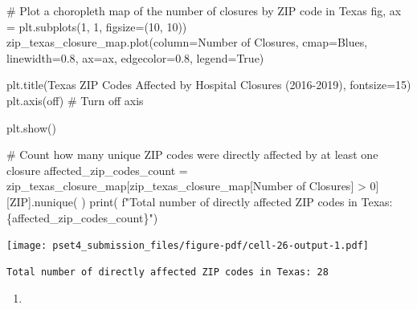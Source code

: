 \documentclass[
  letterpaper,
  DIV=11,
  numbers=noendperiod]{scrartcl}
\newenvironment{Shaded}{\begin{snugshade}}{\end{snugshade}}
\newcommand{\BuiltInTok}[1]{\textcolor[rgb]{0.00,0.23,0.31}{#1}}
\newcommand{\CommentTok}[1]{\textcolor[rgb]{0.37,0.37,0.37}{#1}}
\newcommand{\DecValTok}[1]{\textcolor[rgb]{0.68,0.00,0.00}{#1}}
\newcommand{\FloatTok}[1]{\textcolor[rgb]{0.68,0.00,0.00}{#1}}
\newcommand{\NormalTok}[1]{\textcolor[rgb]{0.00,0.23,0.31}{#1}}
\newcommand{\OperatorTok}[1]{\textcolor[rgb]{0.37,0.37,0.37}{#1}}
\newcommand{\SpecialCharTok}[1]{\textcolor[rgb]{0.37,0.37,0.37}{#1}}
\newcommand{\SpecialStringTok}[1]{\textcolor[rgb]{0.13,0.47,0.30}{#1}}
\newcommand{\StringTok}[1]{\textcolor[rgb]{0.13,0.47,0.30}{#1}}
\newcommand{\VariableTok}[1]{\textcolor[rgb]{0.07,0.07,0.07}{#1}}
\providecommand{\tightlist}{%
  \setlength{\itemsep}{0pt}\setlength{\parskip}{0pt}}\usepackage{longtable,booktabs,array}
\begin{document}
\begin{Shaded}
\begin{Highlighting}[]
\CommentTok{\# Plot a choropleth map of the number of closures by ZIP code in Texas}
\NormalTok{fig, ax }\OperatorTok{=}\NormalTok{ plt.subplots(}\DecValTok{1}\NormalTok{, }\DecValTok{1}\NormalTok{, figsize}\OperatorTok{=}\NormalTok{(}\DecValTok{10}\NormalTok{, }\DecValTok{10}\NormalTok{))}
\NormalTok{zip\_texas\_closure\_map.plot(column}\OperatorTok{=}\StringTok{\textquotesingle{}Number of Closures\textquotesingle{}}\NormalTok{, cmap}\OperatorTok{=}\StringTok{\textquotesingle{}Blues\textquotesingle{}}\NormalTok{,}
\NormalTok{                           linewidth}\OperatorTok{=}\FloatTok{0.8}\NormalTok{, ax}\OperatorTok{=}\NormalTok{ax, edgecolor}\OperatorTok{=}\StringTok{\textquotesingle{}0.8\textquotesingle{}}\NormalTok{, legend}\OperatorTok{=}\VariableTok{True}\NormalTok{)}

\NormalTok{plt.title(}\StringTok{\textquotesingle{}Texas ZIP Codes Affected by Hospital Closures (2016{-}2019)\textquotesingle{}}\NormalTok{, fontsize}\OperatorTok{=}\DecValTok{15}\NormalTok{)}
\NormalTok{plt.axis(}\StringTok{\textquotesingle{}off\textquotesingle{}}\NormalTok{)  }\CommentTok{\# Turn off axis}

\NormalTok{plt.show()}

\CommentTok{\# Count how many unique ZIP codes were directly affected by at least one closure}
\NormalTok{affected\_zip\_codes\_count }\OperatorTok{=}\NormalTok{ zip\_texas\_closure\_map[zip\_texas\_closure\_map[}\StringTok{\textquotesingle{}Number of Closures\textquotesingle{}}\NormalTok{] }\OperatorTok{\textgreater{}} \DecValTok{0}\NormalTok{][}\StringTok{\textquotesingle{}ZIP\textquotesingle{}}\NormalTok{].nunique(}
\NormalTok{)}
\BuiltInTok{print}\NormalTok{(}
    \SpecialStringTok{f"Total number of directly affected ZIP codes in Texas: }\SpecialCharTok{\{}\NormalTok{affected\_zip\_codes\_count}\SpecialCharTok{\}}\SpecialStringTok{"}\NormalTok{)}
\end{Highlighting}
\end{Shaded}

\texttt{[image: pset4\_submission\_files/figure-pdf/cell-26-output-1.pdf]}

\begin{verbatim}
Total number of directly affected ZIP codes in Texas: 28
\end{verbatim}

\begin{enumerate}
\def\labelenumi{\arabic{enumi}.}
\setcounter{enumi}{2}
\tightlist
\item
\end{enumerate}
\end{document}
